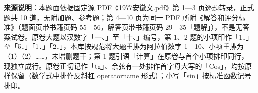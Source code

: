 


\begin{gktip}
\textbf{来源说明}：本题面依据固定源 PDF《1977安徽文.pdf》第 1—3 页逐题转录，正式题共 10 道，无附加题、参考题；第 4—10 页为同一 PDF 所附《解答和评分标准》（题面页带书籍页码 55—56，解答页带书籍页码 29—35「题解」），不是无答案试卷。原卷大题以汉数字「一、」至「十、」编号，第 1、2 题的小项印作「1．」至「5．」「1．」「2．」，本库按规范将大题重排为阿拉伯数字 1—10、小项重排为（1）（2）……，未增删题干；第 1 题引语「计算」在原卷与首个小项排印同行，现独立成行。原卷正切记作「tg」、余弦有一处排作首字母大写的「Cos」，均按原样保留（数学式中排作反斜杠 operatorname 形式）；小写「sin」按标准函数记号排印。
\end{gktip}

\par\medskip

